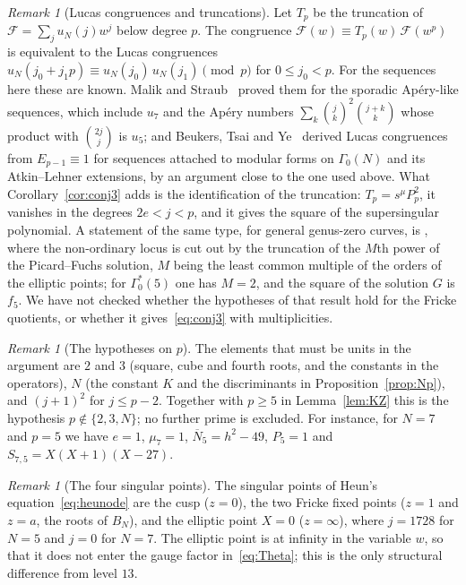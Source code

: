 \documentclass[11pt,a4paper]{article}
\theoremstyle{definition}
\theoremstyle{remark}
\newtheorem{remark}[theorem]{Remark}
\numberwithin{equation}{section}
\begin{document}
\begin{remark}[Lucas congruences and truncations]\label{rem:lucas}
Let $T_p$ be the truncation of $\mathcal F=\sum_ju_N(j)w^j$ below degree $p$.
The congruence $\mathcal F(w)\equiv T_p(w)\,\mathcal F(w^p)$ is equivalent to
the Lucas congruences $u_N(j_0+j_1p)\equiv u_N(j_0)\,u_N(j_1)\pmod p$ for
$0\le j_0<p$. For the sequences here these are known. Malik and
Straub~\cite{MalikStraub} proved them for the sporadic Ap\'ery-like sequences,
which include $u_7$ and the Ap\'ery numbers $\sum_k\binom jk^2\binom{j+k}{k}$
whose product with $\binom{2j}{j}$ is $u_5$; and Beukers, Tsai and
Ye~\cite{BTY} derived Lucas congruences from $E_{p-1}\equiv1$ for sequences
attached to modular forms on $\Gamma_0(N)$ and its Atkin--Lehner extensions,
by an argument close to the one used above. What Corollary~\ref{cor:conj3}
adds is the identification of the truncation: $T_p=s^{\mu}P_p^2$, it vanishes
in the degrees $2e<j<p$, and it gives the square of the supersingular
polynomial. A statement of the same type, for general genus-zero curves, is
\cite[Corollary~3]{Bogo}, where the non-ordinary locus is cut out by the
truncation of the $M$th power of the Picard--Fuchs solution, $M$ being the
least common multiple of the orders of the elliptic points; for
$\Gamma_0^*(5)$ one has $M=2$, and the square of the solution $G$ is $f_5$. We
have not checked whether the hypotheses of that result hold for the Fricke
quotients, or whether it gives~\eqref{eq:conj3} with multiplicities.
\end{remark}

\begin{remark}[The hypotheses on $p$]\label{rem:uniq}
The elements that must be units in the argument are $2$ and $3$ (square,
cube and fourth roots, and the constants in the operators), $N$ (the constant
$K$ and the discriminants in Proposition~\ref{prop:Np}), and $(j+1)^2$ for
$j\le p-2$. Together with $p\ge5$ in Lemma~\ref{lem:KZ} this is the hypothesis
$p\notin\{2,3,N\}$; no further prime is excluded. For instance, for $N=7$ and
$p=5$ we have $e=1$, $\mu_7=1$, $\overline N_5=h^2-49$, $P_5=1$ and
$S_{7,5}=X(X+1)(X-27)$.
\end{remark}

\begin{remark}[The four singular points]\label{rem:four}
The singular points of Heun's equation~\eqref{eq:heunode} are the cusp
($z=0$), the two Fricke fixed points ($z=1$ and $z=a$, the roots of $B_N$), and
the elliptic point $X=0$ ($z=\infty$), where $j=1728$ for $N=5$ and $j=0$ for
$N=7$. The elliptic point is at infinity in the variable $w$, so that it does
not enter the gauge factor in~\eqref{eq:Theta}; this is the only structural
difference from level $13$.
\end{remark}
\end{document}
